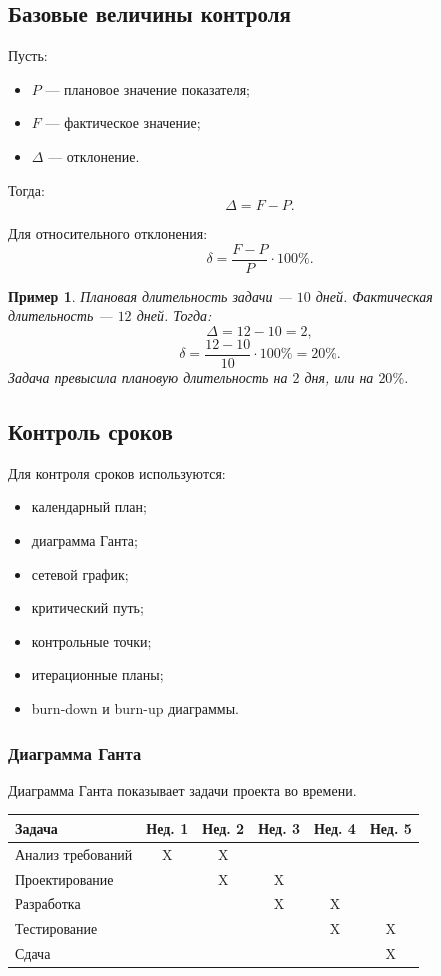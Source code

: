 \documentclass[12pt,a4paper]{article}
\newtheorem{example}{Пример}
\begin{document}
\subsection{Базовые величины контроля}

Пусть:
\begin{itemize}
    \item $P$ --- плановое значение показателя;
    \item $F$ --- фактическое значение;
    \item $\Delta$ --- отклонение.
\end{itemize}

Тогда:
\[
\Delta = F - P.
\]

Для относительного отклонения:
\[
\delta = \frac{F - P}{P} \cdot 100\%.
\]

\begin{example}
Плановая длительность задачи --- $10$ дней. Фактическая длительность --- $12$ дней. Тогда:
\[
\Delta = 12 - 10 = 2,
\]
\[
\delta = \frac{12 - 10}{10} \cdot 100\% = 20\%.
\]
Задача превысила плановую длительность на $2$ дня, или на $20\%$.
\end{example}

\subsection{Контроль сроков}

Для контроля сроков используются:
\begin{itemize}
    \item календарный план;
    \item диаграмма Ганта;
    \item сетевой график;
    \item критический путь;
    \item контрольные точки;
    \item итерационные планы;
    \item burn-down и burn-up диаграммы.
\end{itemize}

\subsubsection*{Диаграмма Ганта}

Диаграмма Ганта показывает задачи проекта во времени.

\begin{center}
\begin{tabular}{|p{4cm}|c|c|c|c|c|}
\hline
\textbf{Задача} & \textbf{Нед. 1} & \textbf{Нед. 2} & \textbf{Нед. 3} & \textbf{Нед. 4} & \textbf{Нед. 5} \\
\hline
Анализ требований & X & X & & & \\
\hline
Проектирование & & X & X & & \\
\hline
Разработка & & & X & X & \\
\hline
Тестирование & & & & X & X \\
\hline
Сдача & & & & & X \\
\hline
\end{tabular}
\end{center}
\end{document}
